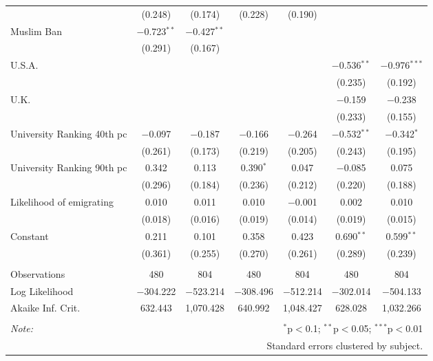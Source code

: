 \begin{sidewaystable}[!htbp]
\begin{tabular}{@{\extracolsep{5pt}}lcccccc}
  & (0.248) & (0.174) & (0.228) & (0.190) &  &  \\ 
  Muslim Ban & $-$0.723$^{**}$ & $-$0.427$^{**}$ &  &  &  &  \\ 
  & (0.291) & (0.167) &  &  &  &  \\ 
  U.S.A. &  &  &  &  & $-$0.536$^{**}$ & $-$0.976$^{***}$ \\ 
  &  &  &  &  & (0.235) & (0.192) \\ 
  U.K. &  &  &  &  & $-$0.159 & $-$0.238 \\ 
  &  &  &  &  & (0.233) & (0.155) \\ 
  University Ranking 40th pc & $-$0.097 & $-$0.187 & $-$0.166 & $-$0.264 & $-$0.532$^{**}$ & $-$0.342$^{*}$ \\ 
  & (0.261) & (0.173) & (0.219) & (0.205) & (0.243) & (0.195) \\ 
  University Ranking 90th pc & 0.342 & 0.113 & 0.390$^{*}$ & 0.047 & $-$0.085 & 0.075 \\ 
  & (0.296) & (0.184) & (0.236) & (0.212) & (0.220) & (0.188) \\ 
  Likelihood of emigrating & 0.010 & 0.011 & 0.010 & $-$0.001 & 0.002 & 0.010 \\ 
  & (0.018) & (0.016) & (0.019) & (0.014) & (0.019) & (0.015) \\ 
  Constant & 0.211 & 0.101 & 0.358 & 0.423 & 0.690$^{**}$ & 0.599$^{**}$ \\ 
  & (0.361) & (0.255) & (0.270) & (0.261) & (0.289) & (0.239) \\ 
 \hline \\[-1.8ex] 
Observations & 480 & 804 & 480 & 804 & 480 & 804 \\ 
Log Likelihood & $-$304.222 & $-$523.214 & $-$308.496 & $-$512.214 & $-$302.014 & $-$504.133 \\ 
Akaike Inf. Crit. & 632.443 & 1,070.428 & 640.992 & 1,048.427 & 628.028 & 1,032.266 \\ 
\hline 
\hline \\[-1.8ex] 
\textit{Note:}  & \multicolumn{6}{r}{$^{*}$p$<$0.1; $^{**}$p$<$0.05; $^{***}$p$<$0.01} \\ 
 & \multicolumn{6}{r}{Standard errors clustered by subject.} \\ 
\end{tabular} 
\end{sidewaystable} 
